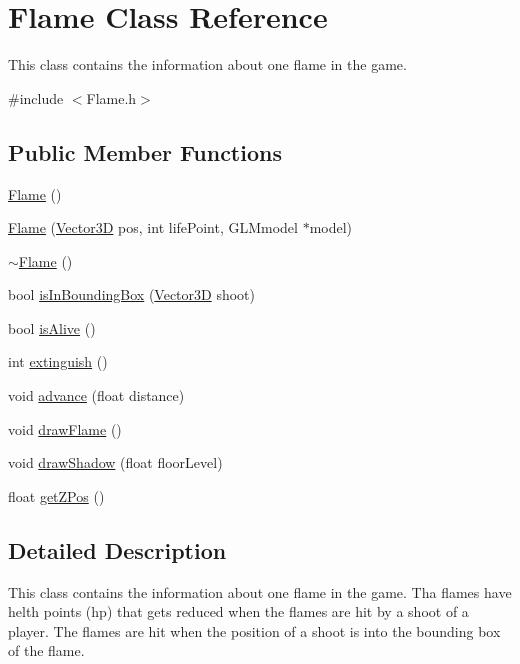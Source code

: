 \hypertarget{classFlame}{
\section{Flame Class Reference}
\label{classFlame}
}


This class contains the information about one flame in the game.  




{\ttfamily \#include $<$Flame.h$>$}

\subsection*{Public Member Functions}
\begin{DoxyCompactItemize}
\item 
\hyperlink{classFlame_a57b7b3fa89daf6286b205747f0d48489}{Flame} ()
\item 
\hyperlink{classFlame_a05d9240d488266a52af6728bf9b9ea56}{Flame} (\hyperlink{classVector3D}{Vector3D} pos, int lifePoint, GLMmodel $\ast$model)
\item 
\hyperlink{classFlame_ab74ae1bf0b8a3f8315af7cc963149608}{$\sim$Flame} ()
\item 
bool \hyperlink{classFlame_a65be7ac4fe325708cc247d53648e30e9}{isInBoundingBox} (\hyperlink{classVector3D}{Vector3D} shoot)
\item 
bool \hyperlink{classFlame_ab640c722a62376f6f4c323e6dbb704ae}{isAlive} ()
\item 
int \hyperlink{classFlame_a680de652b1c92eb697a8c0c21720dadd}{extinguish} ()
\item 
void \hyperlink{classFlame_ac44ae7ca021b2b49089f87a3625152fa}{advance} (float distance)
\item 
void \hyperlink{classFlame_a71b21d01230de74c83b5357f7a2955f3}{drawFlame} ()
\item 
void \hyperlink{classFlame_a9918c5c5e904393c830fc8672e37bc77}{drawShadow} (float floorLevel)
\item 
float \hyperlink{classFlame_ae3bafab240d4ea382dc22a971f8b78b2}{getZPos} ()
\end{DoxyCompactItemize}


\subsection{Detailed Description}
This class contains the information about one flame in the game. Tha flames have helth points (hp) that gets reduced when the flames are hit by a shoot of a player. The flames are hit when the position of a shoot is into the bounding box of the flame.

